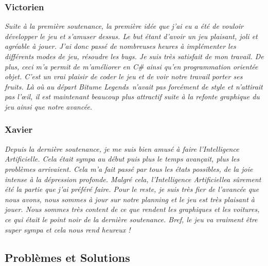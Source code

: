 \documentclass[12pt,a4paper]{article}
\newcommand{\btmlgs}{\textsl{Bitume Legends}}
\newcommand{\AI}{Intelligence Artificielle}
\begin{document}
            \subsubsection{Victorien}
                \textit{Suite à la première soutenance, la première idée que j'ai eu a été
                de vouloir développer le jeu et s'amuser dessus. Le but étant
                d'avoir un jeu plaisant, joli et agréable à jouer. J'ai donc passé
                de nombreuses heures à implémenter les différents modes de jeu, résoudre les 
                \textsl{bugs}. 
                Je suis très satisfait de mon travail. De plus, ceci m'a permit de m'améliorer en 
                \textsl{C\#} ainsi qu'en programmation orientée objet. C'est un vrai plaisir de coder 
                le jeu et de voir notre travail
                porter ses fruits. Là où au départ \btmlgs\, n'avait pas forcément de style et
                n'attirait pas l'œil, il est maintenant beaucoup plus attractif suite à
                la refonte graphique du jeu ainsi que notre avancée.}

            \subsubsection{Xavier}
                \textit{Depuis la dernière soutenance, je me suis bien amusé à faire l'\AI.
                Cela était sympa au début puis plus le temps avançait, plus les problèmes arrivaient.
                Cela m'a fait passé par tous les états possibles, de la joie intense à la dépression
                profonde. Malgré cela, l'\AI a sûrement été la partie que j'ai préféré faire.
                Pour le reste, je suis très fier de l'avancée que nous avons, nous sommes à jour sur 
                notre planning et le jeu est très plaisant à jouer. Nous sommes très content de ce que 
                rendent les graphiques et les voitures, ce qui était le point noir de la dernière 
                soutenance. Bref, le jeu va vraiment être super sympa et cela nous rend heureux ! }


        \clearpage
        \subsection{Problèmes et Solutions}
\end{document}

